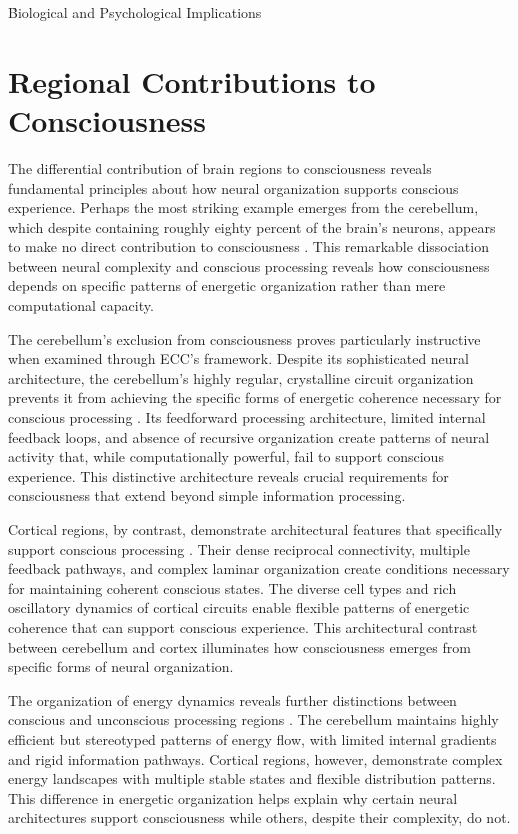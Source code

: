 \h{Biological and Psychological Implications}

\section{Regional Contributions to Consciousness}

\begin{refsection}

The differential contribution of brain regions to consciousness reveals fundamental principles about how neural organization supports conscious experience. Perhaps the most striking example emerges from the cerebellum, which despite containing roughly eighty percent of the brain's neurons, appears to make no direct contribution to consciousness \cite{Herculano-Houzel2010}. This remarkable dissociation between neural complexity and conscious processing reveals how consciousness depends on specific patterns of energetic organization rather than mere computational capacity.

The cerebellum's exclusion from consciousness proves particularly instructive when examined through ECC's framework. Despite its sophisticated neural architecture, the cerebellum's highly regular, crystalline circuit organization prevents it from achieving the specific forms of energetic coherence necessary for conscious processing \cite{Ito2008}. Its feedforward processing architecture, limited internal feedback loops, and absence of recursive organization create patterns of neural activity that, while computationally powerful, fail to support conscious experience. This distinctive architecture reveals crucial requirements for consciousness that extend beyond simple information processing.

Cortical regions, by contrast, demonstrate architectural features that specifically support conscious processing \cite{Fox2005}. Their dense reciprocal connectivity, multiple feedback pathways, and complex laminar organization create conditions necessary for maintaining coherent conscious states. The diverse cell types and rich oscillatory dynamics of cortical circuits enable flexible patterns of energetic coherence that can support conscious experience. This architectural contrast between cerebellum and cortex illuminates how consciousness emerges from specific forms of neural organization.

The organization of energy dynamics reveals further distinctions between conscious and unconscious processing regions \cite{Dehaene2006}. The cerebellum maintains highly efficient but stereotyped patterns of energy flow, with limited internal gradients and rigid information pathways. Cortical regions, however, demonstrate complex energy landscapes with multiple stable states and flexible distribution patterns. This difference in energetic organization helps explain why certain neural architectures support consciousness while others, despite their complexity, do not.


\end{refsection}

